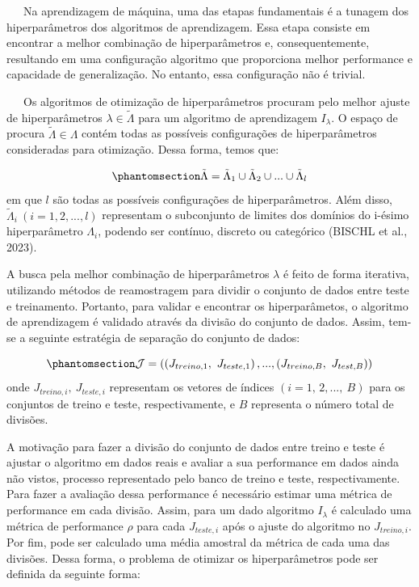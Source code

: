 \documentclass[
  12pt,
  letterpaper,
  DIV=11,
  numbers=noendperiod]{scrreprt}
\begin{document}
~~~Na aprendizagem de máquina, uma das etapas fundamentais é a tunagem
dos hiperparâmetros dos algoritmos de aprendizagem. Essa etapa consiste
em encontrar a melhor combinação de hiperparâmetros e, consequentemente,
resultando em uma configuração algoritmo que proporciona melhor
performance e capacidade de generalização. No entanto, essa configuração
não é trivial.

\vspace{12pt}

~~~Os algoritmos de otimização de hiperparâmetros procuram pelo melhor
ajuste de hiperparâmetros \(\lambda \in \tilde{\Lambda}\) para um
algoritmo de aprendizagem \(I_{\lambda}\). O espaço de procura
\(\tilde{\Lambda} \in \Lambda\) contém todas as possíveis configurações
de hiperparâmetros consideradas para otimização. Dessa forma, temos que:

\begin{equation}\phantomsection\label{eq-space}{
\tilde{\Lambda} = \tilde \Lambda_1 \cup \tilde \Lambda_2 \cup ... \cup \tilde \Lambda_l
}\end{equation} em que \(l\) são todas as possíveis configurações de
hiperparâmetros. Além disso,
\(\tilde \Lambda_i \ \left(i = 1, 2, ..., l\right)\) representam o
subconjunto de limites dos domínios do i-ésimo hiperparâmetro
\(\Lambda_i\), podendo ser contínuo, discreto ou categórico (BISCHL et
al., 2023).

\vspace{12pt}

A busca pela melhor combinação de hiperparâmetros \(\lambda\) é feito de
forma iterativa, utilizando métodos de reamostragem para dividir o
conjunto de dados entre teste e treinamento. Portanto, para validar e
encontrar os hiperparâmetos, o algoritmo de aprendizagem é validado
através da divisão do conjunto de dados. Assim, tem-se a seguinte
estratégia de separação do conjunto de dados:

\begin{equation}\phantomsection\label{eq-teste}{
\mathcal{J} = \left(\left(J_{treino, 1},\ J_{teste, 1}\right), ..., \left(J_{treino, B},\ J_{test, B}\right)\right)
}\end{equation} onde \(J_{treino, i}, \ J_{teste, i}\) representam os
vetores de índices \(\left(i = 1, \, 2, ..., \ B\right)\) para os
conjuntos de treino e teste, respectivamente, e \(B\) representa o
número total de divisões.

\vspace{12pt}

A motivação para fazer a divisão do conjunto de dados entre treino e
teste é ajustar o algoritmo em dados reais e avaliar a sua performance
em dados ainda não vistos, processo representado pelo banco de treino e
teste, respectivamente. Para fazer a avaliação dessa performance é
necessário estimar uma métrica de performance em cada divisão. Assim,
para um dado algoritmo \(I_{\lambda}\) é calculado uma métrica de
performance \(\rho\) para cada \(J_{teste, i}\) após o ajuste do
algoritmo no \(J_{treino, i}\). Por fim, pode ser calculado uma média
amostral da métrica de cada uma das divisões. Dessa forma, o problema de
otimizar os hiperparâmetros pode ser definida da seguinte forma:
\end{document}
